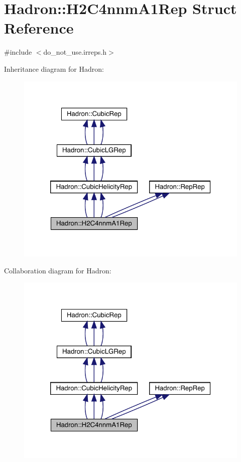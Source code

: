 \hypertarget{structHadron_1_1H2C4nnmA1Rep}{}\section{Hadron\+:\+:H2\+C4nnm\+A1\+Rep Struct Reference}
\label{structHadron_1_1H2C4nnmA1Rep}


{\ttfamily \#include $<$do\+\_\+not\+\_\+use.\+irreps.\+h$>$}



Inheritance diagram for Hadron\+:
\nopagebreak
\begin{figure}[H]
\begin{center}
\leavevmode
\includegraphics[width=320pt]{dd/d05/structHadron_1_1H2C4nnmA1Rep__inherit__graph}
\end{center}
\end{figure}


Collaboration diagram for Hadron\+:
\nopagebreak
\begin{figure}[H]
\begin{center}
\leavevmode
\includegraphics[width=320pt]{d6/db0/structHadron_1_1H2C4nnmA1Rep__coll__graph}
\end{center}
\end{figure}
